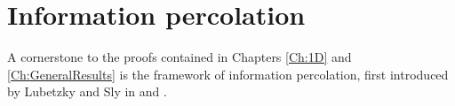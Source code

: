 


\section{Information percolation}
	A cornerstone to the proofs contained in Chapters \ref{Ch:1D} and \ref{Ch:GeneralResults} is the framework of information percolation, first introduced by Lubetzky and Sly in \cite{Lubetzky2013-yv} and \cite{Lubetzky2016-wd}. 


